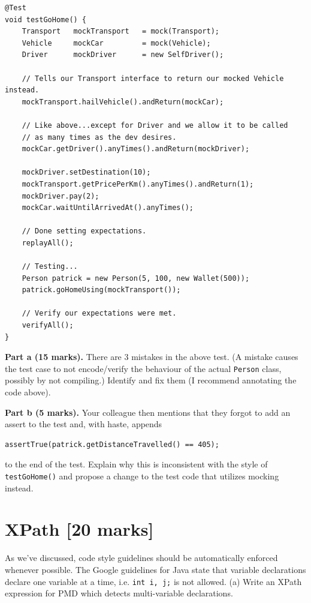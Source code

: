 \documentclass[12pt]{article}
\begin{document}
\begin{lstlisting}
@Test
void testGoHome() {
    Transport   mockTransport   = mock(Transport);
    Vehicle     mockCar         = mock(Vehicle);
    Driver      mockDriver      = new SelfDriver();

    // Tells our Transport interface to return our mocked Vehicle instead.
    mockTransport.hailVehicle().andReturn(mockCar);

    // Like above...except for Driver and we allow it to be called
    // as many times as the dev desires.
    mockCar.getDriver().anyTimes().andReturn(mockDriver);

    mockDriver.setDestination(10);
    mockTransport.getPricePerKm().anyTimes().andReturn(1);
    mockDriver.pay(2);
    mockCar.waitUntilArrivedAt().anyTimes();

    // Done setting expectations.
    replayAll();

    // Testing...
    Person patrick = new Person(5, 100, new Wallet(500));
    patrick.goHomeUsing(mockTransport());

    // Verify our expectations were met.
    verifyAll();
}
\end{lstlisting}
{\bf Part a (15 marks).} There are 3 mistakes in the above test. (A mistake causes the test case to not
encode/verify the behaviour of the actual {\tt Person} class, possibly by not compiling.) Identify and fix them (I recommend annotating the code above).

\vspace*{1em} \noindent
{\bf Part b (5 marks).} Your colleague then mentions that they forgot to add an assert to the test and, with haste, appends
\begin{lstlisting}[numbers=none]
    assertTrue(patrick.getDistanceTravelled() == 405);
\end{lstlisting}
to the end of the test. Explain why this is inconsistent with the style of {\tt testGoHome()} and propose a change to the test code that utilizes mocking instead.

\newpage
\section{XPath [20 marks]}
As we've discussed, code style guidelines should be automatically enforced whenever possible.
The Google guidelines for Java state that variable declarations declare one variable at a time,
i.e. {\tt int i, j;} is not allowed. (a) Write an XPath expression for PMD which detects multi-variable
declarations.
\end{document}
